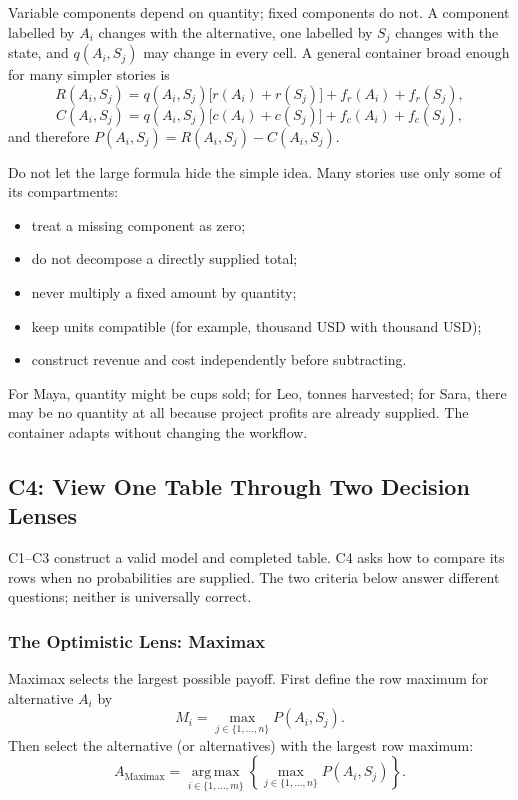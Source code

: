 	Variable components depend on quantity; fixed components do not. A component
	labelled by \(A_i\) changes with the alternative, one labelled by \(S_j\)
	changes with the state, and \(q(A_i,S_j)\) may change in every cell. A general
	container broad enough for many simpler stories is
	\[
	R(A_i,S_j)=q(A_i,S_j)\bigl[r(A_i)+r(S_j)\bigr]
	+f_r(A_i)+f_r(S_j),
	\]
	\[
	C(A_i,S_j)=q(A_i,S_j)\bigl[c(A_i)+c(S_j)\bigr]
	+f_c(A_i)+f_c(S_j),
	\]
	and therefore \(P(A_i,S_j)=R(A_i,S_j)-C(A_i,S_j)\).
	
	Do not let the large formula hide the simple idea. Many stories use only some
	of its compartments:
	\begin{itemize}
		\item treat a missing component as zero;
		\item do not decompose a directly supplied total;
		\item never multiply a fixed amount by quantity;
		\item keep units compatible (for example, thousand USD with thousand USD);
		\item construct revenue and cost independently before subtracting.
	\end{itemize}
	For Maya, quantity might be cups sold; for Leo, tonnes harvested; for Sara,
	there may be no quantity at all because project profits are already supplied.
	The container adapts without changing the workflow.
	
	
	
	\subsection{C4: View One Table Through Two Decision Lenses}
	\label{sec:c4-decision-lenses}
	
	C1--C3 construct a valid model and completed table. C4 asks how to compare its
	rows when no probabilities are supplied. The two criteria below answer
	different questions; neither is universally correct.
	
	\subsubsection*{The Optimistic Lens: Maximax}
	\label{subsec:maximax-lens}
	Maximax selects the largest possible payoff. First define the row maximum for
	alternative \(A_i\) by
	\[
	M_i=\max_{j\in\{1,\ldots,n\}}P(A_i,S_j).
	\]
	Then select the alternative (or alternatives) with the largest row maximum:
	\[
	A_{\text{Maximax}}=
	\operatorname*{arg\,max}_{i\in\{1,\ldots,m\}}
	\left\{\max_{j\in\{1,\ldots,n\}}P(A_i,S_j)\right\}.
	\]
	
